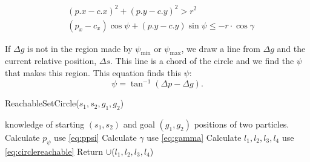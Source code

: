 \begin{align}\label{eq:ifinchord}
&(p.x - c.x)^2 + (p.y - c.y)^2  > r^2\\ \nonumber
 &(p_x - c_x) \cos\psi + (p.y- c.y) \sin\psi \leq -r\cdot \cos\gamma
\end{align}

 If $\Delta g$ is not in the region made by $\psi_{\min}$ or $\psi_{\max}$, we draw a line from $\Delta g$ and the current relative position, $\Delta s$. This line is a chord of the circle and we find the $\psi$ that makes this region. This equation finds this $\psi$:
  \begin{equation}
 \psi = \tan^{-1}(\Delta p - \Delta g ).
 \end{equation}
 
 
\begin{algorithm}[htb]
\caption{ { \sc ReachableSetCircle}($s_1,s_2,g_1,g_2$)}\label{alg:circularReachbale}
\begin{algorithmic}[1]
\Require knowledge of starting $(s_1,s_2)$ and goal $(g_1,g_2)$ positions of  two particles. 
\State Calculate $p_{\psi}$ \Comment use \eqref{eq:ppsi}
\State Calculate $\gamma$ \Comment use \eqref{eq:gamma}
\State Calculate $l_1, l_2, l_3, l_4$ \Comment use \eqref{eq:circlereachable} 
\State Return $\cup$($l_1, l_2, l_3, l_4$)
\end{algorithmic}
\end{algorithm}
 
% 
 

   

